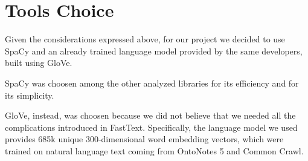 \section{Tools Choice}

Given the considerations expressed above, for our project we decided to use SpaCy and an already trained language model provided by the same developers, built using GloVe.

SpaCy was choosen among the other analyzed libraries for its efficiency and for its simplicity. 

GloVe, instead, was choosen because we did not believe that we needed all the complications introduced in FastText. Specifically, the language model we used provides 685k unique 300-dimensional word embedding vectors, which were trained on natural language text coming from OntoNotes 5\cite{ontonotes5} and Common Crawl\cite{common-crawl}.